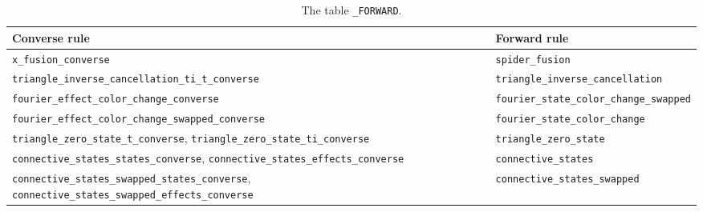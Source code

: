 {\begin{xltabular}{\linewidth}{@{}p{7.2cm}X@{}}
\caption{The table \texttt{\_\allowbreak{}FORWARD}.}\label{tab:lean-export-net-forward}\\
\toprule
Converse rule & Forward rule \\
\midrule
\texttt{x\_\allowbreak{}fusion\_\allowbreak{}converse} & \texttt{spider\_\allowbreak{}fusion} \\
\texttt{triangle\_\allowbreak{}inverse\_\allowbreak{}cancellation\_\allowbreak{}ti\_\allowbreak{}t\_\allowbreak{}converse} & \texttt{triangle\_\allowbreak{}inverse\_\allowbreak{}cancellation} \\
\texttt{fourier\_\allowbreak{}effect\_\allowbreak{}color\_\allowbreak{}change\_\allowbreak{}converse} & \texttt{fourier\_\allowbreak{}state\_\allowbreak{}color\_\allowbreak{}change\_\allowbreak{}swapped} \\
\texttt{fourier\_\allowbreak{}effect\_\allowbreak{}color\_\allowbreak{}change\_\allowbreak{}swapped\_\allowbreak{}converse} & \texttt{fourier\_\allowbreak{}state\_\allowbreak{}color\_\allowbreak{}change} \\
\texttt{triangle\_\allowbreak{}zero\_\allowbreak{}state\_\allowbreak{}t\_\allowbreak{}converse}, \texttt{triangle\_\allowbreak{}zero\_\allowbreak{}state\_\allowbreak{}ti\_\allowbreak{}converse} & \texttt{triangle\_\allowbreak{}zero\_\allowbreak{}state} \\
\texttt{connective\_\allowbreak{}states\_\allowbreak{}states\_\allowbreak{}converse}, \texttt{connective\_\allowbreak{}states\_\allowbreak{}effects\_\allowbreak{}converse} & \texttt{connective\_\allowbreak{}states} \\
\texttt{connective\_\allowbreak{}states\_\allowbreak{}swapped\_\allowbreak{}states\_\allowbreak{}converse}, \texttt{connective\_\allowbreak{}states\_\allowbreak{}swapped\_\allowbreak{}effects\_\allowbreak{}converse} & \texttt{connective\_\allowbreak{}states\_\allowbreak{}swapped} \\
\bottomrule
\end{xltabular}

}
